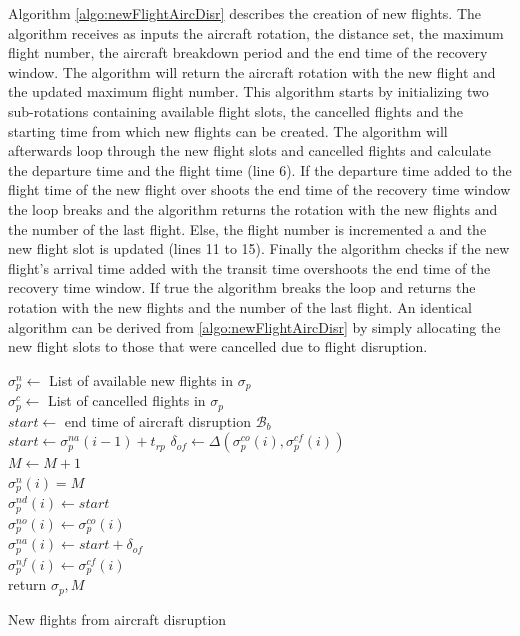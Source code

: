 	
	
	Algorithm \ref{algo:newFlightAircDisr} describes the creation of new flights. The algorithm receives as inputs the aircraft rotation, the distance set, the maximum flight number, the aircraft breakdown period and the end time of the recovery window. The algorithm will return the aircraft rotation with the new flight and the updated maximum flight number. This algorithm starts by initializing two sub-rotations containing available flight slots, the cancelled flights and the starting time from which new flights can be created. The algorithm will afterwards loop through the new flight slots and cancelled flights and calculate the departure time and the flight time (line 6). If the departure time added to the flight time of the new flight over shoots the end time of the recovery time window the loop breaks and the algorithm returns the rotation with the new flights and the number of the last flight. Else, the flight number is incremented a and the new flight slot is updated (lines 11 to 15). Finally the algorithm checks if the new flight's arrival time added with the transit time overshoots the end time of the recovery time window. If true the algorithm breaks the loop  and returns the rotation with the new flights and the number of the last flight. An identical algorithm can be derived from \ref{algo:newFlightAircDisr} by simply allocating the new flight slots to those that were cancelled due to flight disruption.\\
	
	\begin{algorithm}[H]
		\DontPrintSemicolon
		
		$\sigma^n_p \gets$ List of available new flights in $\sigma_p$ \\
		$\sigma^c_p \gets$ List of cancelled flights in $\sigma_p$ \\
		$start \gets$ end time of aircraft disruption $\mathcal{B}_b$\\
		{
			 { $start \gets \sigma^{na}_p(i-1)  + t_{rp}$}
			$\delta_{of} \gets \Delta(\sigma^{co}_p(i), \sigma^{cf}_p(i))$\\
			$M \gets M + 1$\\
			$\sigma^n_p(i) = M$\\
			$\sigma^{nd}_p(i) \gets start$ \\
			$\sigma^{no}_p(i) \gets \sigma^{co}_p(i)$\\
			$\sigma^{na}_p(i) \gets start + \delta_{of}$\\
			$\sigma^{nf}_p(i) \gets \sigma^{cf}_p(i)$\\
		}
		return $\sigma_p, M$
		\caption{New flights from aircraft disruption}
		\label{algo:newFlightAircDisr}
	\end{algorithm}


